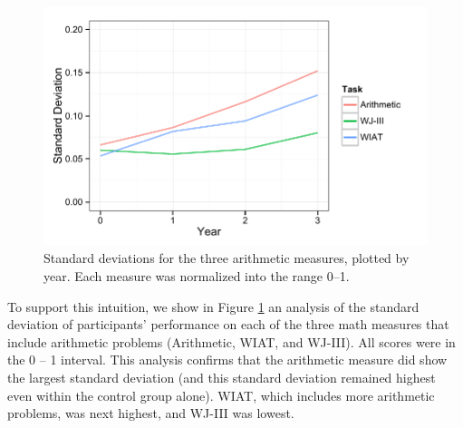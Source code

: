 \documentclass[11pt]{article}
\begin{document}
\begin{figure}[H]
\begin{center}
\includegraphics[width=4.5in]{figures/SDs.pdf}
\end{center}
\caption{Standard deviations for the three arithmetic measures, plotted by year. Each measure was normalized into the range 0--1.}
\label{fig:sds}
\end{figure}

To support this intuition, we show in Figure \ref{fig:sds} an analysis of the standard deviation of participants' performance on each of the three math measures that include arithmetic problems (Arithmetic, WIAT, and WJ-III). All scores were in the 0 -- 1 interval. This analysis confirms that the arithmetic measure did show the largest standard deviation (and this standard deviation remained highest even within the control group alone).  WIAT, which includes more arithmetic problems, was next highest, and WJ-III was lowest. 



\newpage


 
\end{document}
